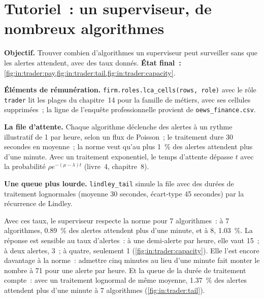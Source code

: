 \section{Tutoriel~: un superviseur, de nombreux algorithmes}\label{tut:in:trader:tut}

\begin{tutorial}
\textbf{Objectif.} Trouver combien d'algorithmes un superviseur peut surveiller sans que les alertes attendent, avec des taux donnés.
\textbf{État final~:} \cref{fig:in:trader:pay,fig:in:trader:tail,fig:in:trader:capacity}.
\begin{tutsteps}
\item \textbf{Éléments de rémunération.} \texttt{firm.roles.lca\_cells(rows, role)} avec le rôle \texttt{trader} lit les plages du chapitre~14 pour la famille de métiers,
avec ses cellules supprimées~; la ligne de l'enquête professionnelle provient de \texttt{oews\_finance.csv}.
\item \textbf{La file d'attente.} Chaque algorithme déclenche des alertes à un rythme illustratif de 1 par heure, selon un flux de Poisson~; le traitement dure
30 secondes en moyenne~; la norme veut qu'au plus 1~\% des alertes attendent plus d'une minute. Avec un traitement exponentiel,
le temps d'attente dépasse $t$ avec la probabilité $\rho e^{-(\mu-\lambda)t}$ (livre~4, chapitre~8).
\label{lst:in:trader:mm1}
\item \textbf{Une queue plus lourde.} \texttt{lindley\_tail} simule la file avec des durées de traitement lognormales (moyenne 30 secondes,
écart-type 45 secondes) par la récurrence de Lindley.
\end{tutsteps}
\end{tutorial}

Avec ces taux, le superviseur respecte la norme pour 7 algorithmes~: à 7 algorithmes, 0.89~\% des alertes attendent plus
d'une minute, et à 8, 1.03~\%. La réponse est sensible au taux d'alertes~: à une demi-alerte par heure, elle vaut 15~; à deux alertes, 3~; à
quatre, seulement 1 (\cref{fig:in:trader:capacity}). Elle l'est encore davantage à la norme~: admettre cinq minutes au lieu
d'une minute fait monter le nombre à 71 pour une alerte par heure. Et la queue de la durée de traitement compte~: avec un traitement lognormal
de même moyenne, 1.37~\% des alertes attendent plus d'une minute à 7 algorithmes (\cref{fig:in:trader:tail}).

